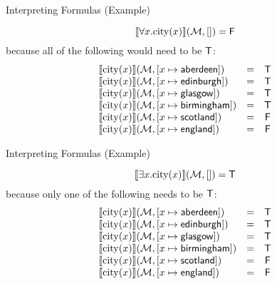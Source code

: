\documentclass[xetex,aspectratio=169,14pt,hyperref={pdfpagelabels=true,pdflang={en-GB}}]{beamer}
\begin{document}
\begin{frame}
  {Interpreting Formulas (Example)}

  \begin{displaymath}
    \llbracket \forall x. \mathrm{city}(x) \rrbracket(\mathcal{M},[]) = \mathsf{F}
  \end{displaymath}
  because all of the following would need to be $\mathsf{T}$:
  \begin{displaymath}
    \begin{array}{lcc}
      \llbracket \mathrm{city}(x) \rrbracket(\mathcal{M},[x\mapsto\mathsf{aberdeen}]) &=& \mathsf{T}\\
      \llbracket \mathrm{city}(x) \rrbracket(\mathcal{M},[x\mapsto\mathsf{edinburgh}]) &=& \mathsf{T}\\
      \llbracket \mathrm{city}(x) \rrbracket(\mathcal{M},[x\mapsto\mathsf{glasgow}]) &=& \mathsf{T}\\
      \llbracket \mathrm{city}(x) \rrbracket(\mathcal{M},[x\mapsto\mathsf{birmingham}]) &=& \mathsf{T}\\
      \llbracket \mathrm{city}(x) \rrbracket(\mathcal{M},[x\mapsto\mathsf{scotland}]) &=& \mathsf{F}\\
      \llbracket \mathrm{city}(x) \rrbracket(\mathcal{M},[x\mapsto\mathsf{england}]) &=& \mathsf{F}\\
    \end{array}
  \end{displaymath}
\end{frame}

\begin{frame}
  {Interpreting Formulas (Example)}

  \begin{displaymath}
    \llbracket \exists x. \mathrm{city}(x) \rrbracket(\mathcal{M},[]) = \mathsf{T}
  \end{displaymath}
  because only one of the following needs to be $\mathsf{T}$:
  \begin{displaymath}
    \begin{array}{lcc}
      \llbracket \mathrm{city}(x) \rrbracket(\mathcal{M},[x\mapsto\mathsf{aberdeen}]) &=& \mathsf{T}\\
      \llbracket \mathrm{city}(x) \rrbracket(\mathcal{M},[x\mapsto\mathsf{edinburgh}]) &=& \mathsf{T}\\
      \llbracket \mathrm{city}(x) \rrbracket(\mathcal{M},[x\mapsto\mathsf{glasgow}]) &=& \mathsf{T}\\
      \llbracket \mathrm{city}(x) \rrbracket(\mathcal{M},[x\mapsto\mathsf{birmingham}]) &=& \mathsf{T}\\
      \llbracket \mathrm{city}(x) \rrbracket(\mathcal{M},[x\mapsto\mathsf{scotland}]) &=& \mathsf{F}\\
      \llbracket \mathrm{city}(x) \rrbracket(\mathcal{M},[x\mapsto\mathsf{england}]) &=& \mathsf{F}\\
    \end{array}
  \end{displaymath}
\end{frame}
\end{document}
